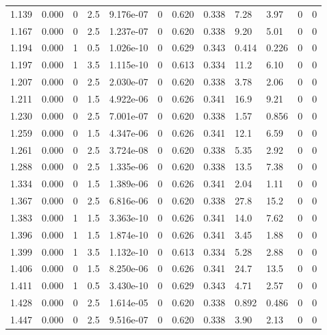 \documentclass[preview]{standalone}
\begin{document}
{{{\begin{tabular}{L{1.2cm}C{1.2cm} C{0.3cm}C{0.5cm} C{1.4cm}C{1.4cm} C{1.4cm}C{1.4cm} C{1.6cm}C{1.6cm} C{1.6cm}C{1.6cm}}
  1.139  &  0.000  & 0     & 2.5 &  9.176e-07  & 0  &  0.620&   0.338& 7.28 & 3.97   &  0 & 0  \\ 
  1.167  &  0.000  & 0     & 2.5 &  1.237e-07  & 0  &  0.620&   0.338& 9.20 & 5.01   &  0 & 0  \\ 
  1.194  &  0.000  & 1     & 0.5 &  1.026e-10  & 0  &  0.629&   0.343& 0.414 & 0.226   &  0 & 0  \\ 
  1.197  &  0.000  & 1     & 3.5 &  1.115e-10  & 0  &  0.613&   0.334& 11.2 & 6.10   &  0 & 0  \\ 
  1.207  &  0.000  & 0     & 2.5 &  2.030e-07  & 0  &  0.620&   0.338& 3.78 & 2.06   &  0 & 0  \\ 
  1.211  &  0.000  & 0     & 1.5 &  4.922e-06  & 0  &  0.626&   0.341& 16.9 & 9.21   &  0 & 0  \\ 
  1.230  &  0.000  & 0     & 2.5 &  7.001e-07  & 0  &  0.620&   0.338& 1.57 & 0.856   &  0 & 0  \\ 
  1.259  &  0.000  & 0     & 1.5 &  4.347e-06  & 0  &  0.626&   0.341& 12.1 & 6.59   &  0 & 0  \\ 
  1.261  &  0.000  & 0     & 2.5 &  3.724e-08  & 0  &  0.620&   0.338& 5.35 & 2.92   &  0 & 0  \\ 
  1.288  &  0.000  & 0     & 2.5 &  1.335e-06  & 0  &  0.620&   0.338& 13.5 & 7.38   &  0 & 0  \\ 
  1.334  &  0.000  & 0     & 1.5 &  1.389e-06  & 0  &  0.626&   0.341& 2.04 & 1.11   &  0 & 0  \\ 
  1.367  &  0.000  & 0     & 2.5 &  6.816e-06  & 0  &  0.620&   0.338& 27.8 & 15.2   &  0 & 0  \\ 
  1.383  &  0.000  & 1     & 1.5 &  3.363e-10  & 0  &  0.626&   0.341& 14.0 & 7.62   &  0 & 0  \\ 
  1.396  &  0.000  & 1     & 1.5 &  1.874e-10  & 0  &  0.626&   0.341& 3.45 & 1.88   &  0 & 0  \\ 
  1.399  &  0.000  & 1     & 3.5 &  1.132e-10  & 0  &  0.613&   0.334& 5.28 & 2.88   &  0 & 0  \\ 
  1.406  &  0.000  & 0     & 1.5 &  8.250e-06  & 0  &  0.626&   0.341& 24.7 & 13.5   &  0 & 0  \\ 
  1.411  &  0.000  & 1     & 0.5 &  3.430e-10  & 0  &  0.629&   0.343& 4.71 & 2.57   &  0 & 0  \\ 
  1.428  &  0.000  & 0     & 2.5 &  1.614e-05  & 0  &  0.620&   0.338& 0.892 & 0.486   &  0 & 0  \\ 
  1.447  &  0.000  & 0     & 2.5 &  9.516e-07  & 0  &  0.620&   0.338& 3.90 & 2.13   &  0 & 0  \\ 

\end{tabular}}}}
\end{document}
